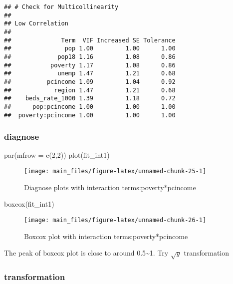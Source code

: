 \documentclass[
  11pt,
]{article}
\newenvironment{Shaded}{\begin{snugshade}}{\end{snugshade}}
\newcommand{\AttributeTok}[1]{\textcolor[rgb]{0.77,0.63,0.00}{#1}}
\newcommand{\DecValTok}[1]{\textcolor[rgb]{0.00,0.00,0.81}{#1}}
\newcommand{\FunctionTok}[1]{\textcolor[rgb]{0.00,0.00,0.00}{#1}}
\newcommand{\NormalTok}[1]{#1}
\begin{document}
\begin{verbatim}
## # Check for Multicollinearity
## 
## Low Correlation
## 
##              Term  VIF Increased SE Tolerance
##               pop 1.00         1.00      1.00
##             pop18 1.16         1.08      0.86
##           poverty 1.17         1.08      0.86
##             unemp 1.47         1.21      0.68
##          pcincome 1.09         1.04      0.92
##            region 1.47         1.21      0.68
##    beds_rate_1000 1.39         1.18      0.72
##      pop:pcincome 1.00         1.00      1.00
##  poverty:pcincome 1.00         1.00      1.00
\end{verbatim}

\hypertarget{diagnose}{%
\subsubsection{diagnose}\label{diagnose}}

\begin{Shaded}
\begin{Highlighting}[]
\FunctionTok{par}\NormalTok{(}\AttributeTok{mfrow =} \FunctionTok{c}\NormalTok{(}\DecValTok{2}\NormalTok{,}\DecValTok{2}\NormalTok{))}
\FunctionTok{plot}\NormalTok{(fit\_int1)}
\end{Highlighting}
\end{Shaded}

\begin{figure}
\texttt{[image: main\_files/figure-latex/unnamed-chunk-25-1]} \caption{\label{fig:figs}Diagnose plots with interaction terms:poverty*pcincome}\label{fig:unnamed-chunk-25}
\end{figure}

\begin{Shaded}
\begin{Highlighting}[]
\FunctionTok{boxcox}\NormalTok{(fit\_int1)}
\end{Highlighting}
\end{Shaded}

\begin{figure}
\texttt{[image: main\_files/figure-latex/unnamed-chunk-26-1]} \caption{\label{fig:figs}Boxcox plot with interaction terms:poverty*pcincome}\label{fig:unnamed-chunk-26}
\end{figure}

The peak of boxcox plot is close to around 0.5\textasciitilde1. Try
\(\sqrt{y}\) transformation

\hypertarget{transformation-1}{%
\subsubsection{transformation}\label{transformation-1}}
\end{document}
